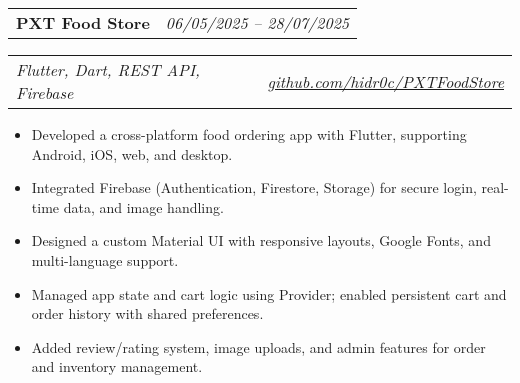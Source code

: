 \documentclass[a4paper,11pt]{article}
\begin{document}
\begin{spacing}{1.05}
\begin{minipage}[t]{\linewidth}
  \begin{tabularx}{\linewidth}{@{}l r@{}}
    \textbf{PXT Food Store} & \hspace*{0.63\linewidth}\normalsize\textit{06/05/2025 – 28/07/2025} \\
  \end{tabularx}
  \begin{tabularx}{\linewidth}{@{}l r@{}}
  \normalsize\textit{Flutter, Dart, REST API, Firebase} & \hspace*{0.405\linewidth}\href{https://github.com/hidr0c/PXTFoodStore}{\normalsize\textit{github.com/hidr0c/PXTFoodStore}}\\
  \end{tabularx}
 \begin{itemize} [nosep,leftmargin=1.2em,itemsep=2pt]
  \item Developed a cross-platform food ordering app with Flutter, supporting Android, iOS, web, and desktop.
  \item Integrated Firebase (Authentication, Firestore, Storage) for secure login, real-time data, and image handling.
  \item Designed a custom Material UI with responsive layouts, Google Fonts, and multi-language support.
  \item Managed app state and cart logic using Provider; enabled persistent cart and order history with shared preferences.
  \item Added review/rating system, image uploads, and admin features for order and inventory management. 
  \\
\end{itemize}



  
\end{minipage}
\end{spacing}

\end{document}
